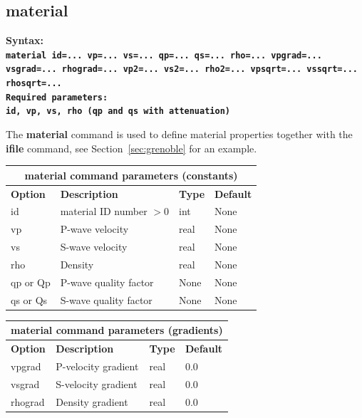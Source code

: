 \documentclass[11pt]{report}
\begin{document}
\subsection{material}
\label{keyword:material}
\begin{flushleft}\bf
Syntax:\\
\tt material
id=... vp=... vs=... qp=... qs=... rho=... vpgrad=... vsgrad=... rhograd=... vp2=... vs2=... rho2=... vpsqrt=... vssqrt=... rhosqrt=...\\ 
\bf Required parameters:\\
\tt id, vp, vs, rho (qp and qs with attenuation)
\end{flushleft}
The {\bf material} command is used to define material properties together with the {\bf ifile}
command, see Section~\ref{sec:grenoble} for an example.
\begin{center}
\begin{tabular}{|l|p{8cm}|l|l|} \hline
\multicolumn{4}{|c|}{\bf material command parameters (constants)}\\ \hline
\bf{Option} & \bf{Description} & \bf{Type} & \bf{Default} \\ \hline \hline
id & material ID number $>0$         & int & None  \\ \hline
vp & P-wave velocity & real & None \\ \hline
vs & S-wave velocity & real & None \\ \hline
rho & Density & real & None \\ \hline
qp or Qp & P-wave quality factor & None & None \\ \hline
qs or Qs & S-wave quality factor & None & None \\ \hline
\end{tabular}
\end{center}
\begin{center}
\begin{tabular}{|l|p{8cm}|l|l|} \hline
\multicolumn{4}{|c|}{\bf material command parameters (gradients)}\\ \hline
\bf{Option} & \bf{Description} & \bf{Type} & \bf{Default} \\ \hline \hline
vpgrad & P-velocity gradient & real & 0.0 \\ \hline
vsgrad & S-velocity gradient & real & 0.0 \\ \hline
rhograd & Density gradient   & real & 0.0 \\ \hline
\end{tabular}
\end{center}
\end{document}
